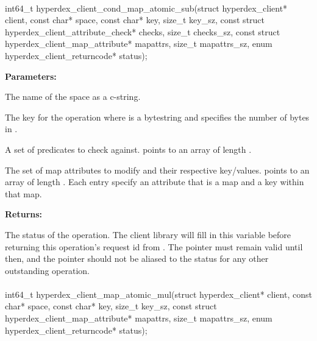 \paragraph{}
\label{api:c:cond_map_atomic_sub}
\begin{ccode}
int64_t hyperdex_client_cond_map_atomic_sub(struct hyperdex_client* client,
        const char* space,
        const char* key, size_t key_sz,
        const struct hyperdex_client_attribute_check* checks, size_t checks_sz,
        const struct hyperdex_client_map_attribute* mapattrs, size_t mapattrs_sz,
        enum hyperdex_client_returncode* status);
\end{ccode}
\funcdesc 

\noindent\textbf{Parameters:}
\begin{description}[labelindent=\widthof{{\code{mapattrs}, \code{mapattrs\_sz}}},leftmargin=*,noitemsep,nolistsep,align=right]
\item[\code{space}] The name of the space as a c-string.
\item[\code{key}, \code{key\_sz}] The key for the operation where  is a bytestring and  specifies the number of bytes in .
\item[\code{checks}, \code{checks\_sz}] A set of predicates to check against.   points to an array of length .
\item[\code{mapattrs}, \code{mapattrs\_sz}] The set of map attributes to modify and their respective key/values.   points to an array of length .  Each entry specify an attribute that is a map and a key within that map.
\end{description}

\noindent\textbf{Returns:}
\begin{description}[labelindent=\widthof{{\code{status}}},leftmargin=*,noitemsep,nolistsep,align=right]
\item[\code{status}] The status of the operation.  The client library will fill in this variable before returning this operation's request id from .  The pointer must remain valid until then, and the pointer should not be aliased to the status for any other outstanding operation.
\end{description}

\paragraph{}
\label{api:c:map_atomic_mul}
\begin{ccode}
int64_t hyperdex_client_map_atomic_mul(struct hyperdex_client* client,
        const char* space,
        const char* key, size_t key_sz,
        const struct hyperdex_client_map_attribute* mapattrs, size_t mapattrs_sz,
        enum hyperdex_client_returncode* status);
\end{ccode}
\funcdesc 

